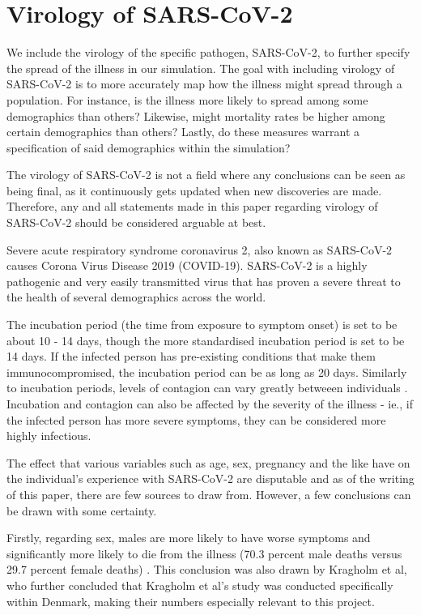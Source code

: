 \section{Virology of SARS-CoV-2} \label{sub:virology}

We include the virology of the specific pathogen, SARS-CoV-2, to further specify the spread of the illness in our simulation. The goal with including virology of SARS-CoV-2 is to more accurately map how the illness might spread through a population. For instance, is the illness more likely to spread among some demographics than others? Likewise, might mortality rates be higher among certain demographics than others? Lastly, do these measures warrant a specification of said demographics within the simulation? 

The virology of SARS-CoV-2 is not a field where any conclusions can be seen as being final, as it continuously gets updated when new discoveries are made. Therefore, any and all statements made in this paper regarding virology of SARS-CoV-2 should be considered arguable at best.

Severe acute respiratory syndrome coronavirus 2, also known as SARS-CoV-2 causes  Corona Virus Disease 2019 (COVID-19). SARS-CoV-2 is a highly pathogenic and very easily transmitted virus that has proven a severe threat to the health of several demographics across the world.  

The incubation period (the time from exposure to symptom onset) is set to be about 10 - 14 days, though the more standardised incubation period is set to be 14 days. If the infected person has pre-existing conditions that make them immunocompromised, the incubation period can be as long as 20 days. Similarly to incubation periods, levels of contagion can vary greatly betweeen individuals \citep{ries_how_2020}. Incubation and contagion can also be affected by the severity of the illness - ie., if the infected person has more severe symptoms, they can be considered more highly infectious.

The effect that various variables such as age, sex, pregnancy and the like have on the individual's experience with SARS-CoV-2 are disputable and as of the writing of this paper, there are few sources to draw from. However, a few conclusions can be drawn with some certainty.

Firstly, regarding sex, males are more likely to have worse symptoms and significantly more likely to die from the illness (70.3 percent male deaths versus 29.7 percent female deaths) \citep{jin_gender_2020}. This conclusion was also drawn by Kragholm et al, who further concluded that  \citep{kragholm_association_nodate} Kragholm et al's study was conducted specifically within Denmark, making their numbers especially relevant to this project.


